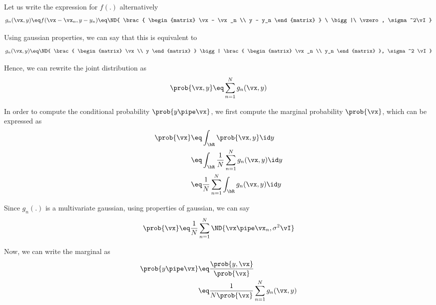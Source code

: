 \documentclass{article}
\begin{document}
\begin{question}

	Let us write the expression for $f(.)$ alternatively
	\begin{align*}
		g_n(\vx, y)	\eq	f(\vx - \vx_n, y - y_n)	\eq	\ND{
			\brac{
				\begin{matrix}
					\vx - \vx_n \\
					y - y_n
				\end{matrix}
			} \ \bigg|\ \vzero, \sigma^2\vI
		}
	\end{align*}

	Using gaussian properties, we can say that this is equivalent to
	\begin{align*}
		g_n(\vx, y)	\eq	\ND{
			\brac{
				\begin{matrix}
					\vx \\
					y
				\end{matrix}
			}
			\bigg| \brac{
				\begin{matrix}
					\vx_n \\
					y_n
				\end{matrix}
			}, \sigma^2 \vI
		}
	\end{align*}

	Hence, we can rewrite the joint distribution as
	\begin{align*}
		\prob{\vx, y}	\eq	\sum_{n = 1}^N g_n(\vx, y)
	\end{align*}

	In order to compute the conditional probability $\prob{y \pipe \vx}$, we first compute the marginal probability $\prob{\vx}$, which can be expressed as
	\begin{align*}
		\prob{\vx}	&\eq	\int_\bR \prob{\vx, y} \id y \\
		&\eq	\int_\bR \frac{1}{N} \sum_{n = 1}^N g_n(\vx, y) \id y \\
		&\eq	\frac{1}{N} \sum_{n = 1}^N \int_\bR g_n(\vx, y) \id y \\
	\end{align*}

	Since $g_n(.)$ is a multivariate gaussian, using properties of gaussian, we can say
	\begin{align*}
		\prob{\vx}	\eq	\frac{1}{N} \sum_{n = 1}^N \ND{\vx \pipe \vx_n, \sigma^2 \vI}
	\end{align*}

	Now, we can write the marginal as
	\begin{align*}
		\prob{y \pipe \vx}	&\eq	\frac{\prob{y, \vx}}{\prob{\vx}} \\
		&\eq	\frac{1}{N \prob{\vx}} \sum_{n = 1}^N g_n(\vx, y)
	\end{align*}


\end{question}
\end{document}
